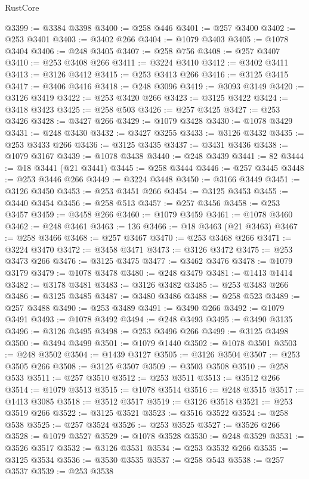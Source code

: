 \begin{lexlean}{RustCore}
\begin{coremodule}
@3399 := @3384 @3398
@3400 := @258 @446
@3401 := @257 @3400
@3402 := @253 @3401
@3403 := @3402 @266
@3404 := @1079 @3403
@3405 := @1078 @3404
@3406 := @248 @3405
@3407 := @258 @756
@3408 := @257 @3407
@3410 := @253 @3408 @266
@3411 := @3224 @3410
@3412 := @3402 @3411
@3413 := @3126 @3412
@3415 := @253 @3413 @266
@3416 := @3125 @3415
@3417 := @3406 @3416
@3418 := @248 @3096
@3419 := @3093 @3149
@3420 := @3126 @3419
@3422 := @253 @3420 @266
@3423 := @3125 @3422
@3424 := @3418 @3423
@3425 := @258 @503
@3426 := @257 @3425
@3427 := @253 @3426
@3428 := @3427 @266
@3429 := @1079 @3428
@3430 := @1078 @3429
@3431 := @248 @3430
@3432 := @3427 @3255
@3433 := @3126 @3432
@3435 := @253 @3433 @266
@3436 := @3125 @3435
@3437 := @3431 @3436
@3438 := @1079 @3167
@3439 := @1078 @3438
@3440 := @248 @3439
@3441 := 82
@3444 := @18 @3441 (@21 @3441)
@3445 := @258 @3444
@3446 := @257 @3445
@3448 := @253 @3446 @266
@3449 := @3224 @3448
@3450 := @3166 @3449
@3451 := @3126 @3450
@3453 := @253 @3451 @266
@3454 := @3125 @3453
@3455 := @3440 @3454
@3456 := @258 @513
@3457 := @257 @3456
@3458 := @253 @3457
@3459 := @3458 @266
@3460 := @1079 @3459
@3461 := @1078 @3460
@3462 := @248 @3461
@3463 := 136
@3466 := @18 @3463 (@21 @3463)
@3467 := @258 @3466
@3468 := @257 @3467
@3470 := @253 @3468 @266
@3471 := @3224 @3470
@3472 := @3458 @3471
@3473 := @3126 @3472
@3475 := @253 @3473 @266
@3476 := @3125 @3475
@3477 := @3462 @3476
@3478 := @1079 @3179
@3479 := @1078 @3478
@3480 := @248 @3479
@3481 := @1413 @1414
@3482 := @3178 @3481
@3483 := @3126 @3482
@3485 := @253 @3483 @266
@3486 := @3125 @3485
@3487 := @3480 @3486
@3488 := @258 @523
@3489 := @257 @3488
@3490 := @253 @3489
@3491 := @3490 @266
@3492 := @1079 @3491
@3493 := @1078 @3492
@3494 := @248 @3493
@3495 := @3490 @3135
@3496 := @3126 @3495
@3498 := @253 @3496 @266
@3499 := @3125 @3498
@3500 := @3494 @3499
@3501 := @1079 @1440
@3502 := @1078 @3501
@3503 := @248 @3502
@3504 := @1439 @3127
@3505 := @3126 @3504
@3507 := @253 @3505 @266
@3508 := @3125 @3507
@3509 := @3503 @3508
@3510 := @258 @533
@3511 := @257 @3510
@3512 := @253 @3511
@3513 := @3512 @266
@3514 := @1079 @3513
@3515 := @1078 @3514
@3516 := @248 @3515
@3517 := @1413 @3085
@3518 := @3512 @3517
@3519 := @3126 @3518
@3521 := @253 @3519 @266
@3522 := @3125 @3521
@3523 := @3516 @3522
@3524 := @258 @538
@3525 := @257 @3524
@3526 := @253 @3525
@3527 := @3526 @266
@3528 := @1079 @3527
@3529 := @1078 @3528
@3530 := @248 @3529
@3531 := @3526 @3517
@3532 := @3126 @3531
@3534 := @253 @3532 @266
@3535 := @3125 @3534
@3536 := @3530 @3535
@3537 := @258 @543
@3538 := @257 @3537
@3539 := @253 @3538

\end{coremodule}
\end{lexlean}

